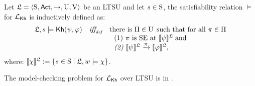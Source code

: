     {\color{red}
    \begin{definition} \label{def:semantics-kh-uncertain-alt}
        Let $\model = \tup{\S,\Act,\ra,\Unc,\V}$ be an LTSU and let $s\in\S$, the satisfiability relation $\models$ for $\Khlogic$ is inductively defined as:
        \[
        \begin{array}{l@{\ \ \ }c@{\ \ \  }l}
        \model, s \models \kh(\psi,\varphi) & \iffdef & \text{there is } \plans \in \Unc \;\text{such that for all } \plan\in\plans \\
        & & \ \ \text{\rm (1)} \ \plan \text{ is SE at }  \truthset{\model}{\psi}\; \text{and} \\
        & & \ \ \text{\em (2)} \ \truthset{\model}{\psi} \reach{\plan} \truthset{\model}{\varphi}, 
        \end{array}
        \]      where: $\truthset{\model}{\chi} := \csetsc{s\in\S}{\model,w\models\chi}$. 
    \end{definition}
    }

    \begin{proposition}
        The model-checking problem for $\Khlogic$ over LTSU is in \PTIME.
    \end{proposition}
